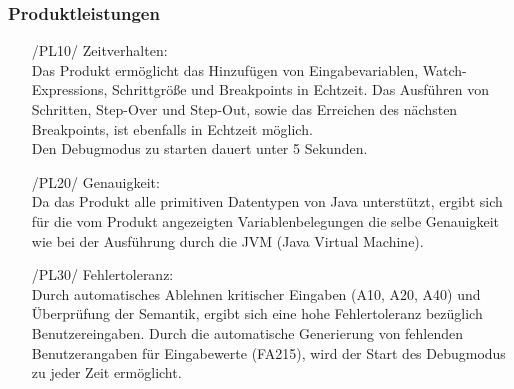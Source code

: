 \documentclass[parskip=full]{scrartcl}
\begin{document}
		\subsubsection{Produktleistungen}
		\begin{itemize}
		\item[/PL10/] Zeitverhalten: \\
		Das Produkt ermöglicht das Hinzufügen von Eingabevariablen, Watch-Expressions, Schrittgröße und Breakpoints in Echtzeit. Das Ausführen von Schritten, Step-Over und Step-Out, sowie das Erreichen des nächsten Breakpoints, ist ebenfalls in Echtzeit möglich. \\
		Den Debugmodus zu starten dauert unter 5 Sekunden. 
		\item[/PL20/] Genauigkeit: \\
		Da das Produkt alle primitiven Datentypen von Java unterstützt, ergibt sich für die vom Produkt angezeigten Variablenbelegungen die selbe Genauigkeit wie bei der Ausführung durch die JVM (Java Virtual Machine).
		\item[/PL30/] Fehlertoleranz: \\
		Durch automatisches Ablehnen kritischer Eingaben (A10, A20, A40) und Überprüfung der Semantik, ergibt sich eine hohe Fehlertoleranz bezüglich Benutzereingaben.
		Durch die automatische Generierung von fehlenden Benutzerangaben für Eingabewerte (FA215), wird der Start des Debugmodus zu jeder Zeit ermöglicht.
		\end{itemize}
		
\end{document}

